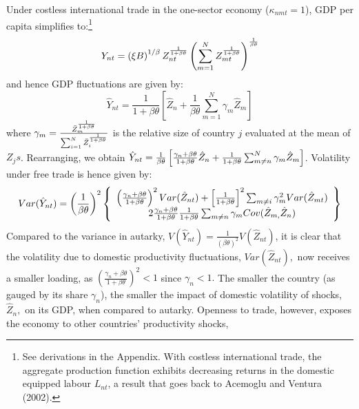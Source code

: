 \documentclass[12pt]{article}
\begin{document}
Under costless international trade in the one-sector economy ($\kappa
_{nmt}=1$), GDP per capita simplifies to:\footnote{%
See derivations in the Appendix. With costless international trade, the
aggregate production function exhibits decreasing returns in the domestic
equipped labour $L_{nt}$, a result that goes back to Acemoglu and Ventura
(2002).} 
\begin{equation*}
Y_{nt}=\left( \xi B\right) ^{1/\beta }Z_{nt}^{\frac{1}{1+\beta \theta }%
}\left( \sum_{m=1}^{N}Z_{mt}^{\frac{1}{1+\beta \theta }}\right) ^{\frac{1}{%
\beta \theta }}
\end{equation*}%
and hence GDP fluctuations are given by: 
\begin{equation*}
\hat{Y}_{nt}=\frac{1}{1+\beta \theta }\left[ \hat{Z}_{n}+\frac{1}{\beta
\theta }\sum_{m=1}^{N}\gamma _{m}\hat{Z}_{m}\right]
\end{equation*}%
where $\gamma _{m}=\frac{\bar{Z}_{m}^{\frac{1}{1+\beta \theta }}}{%
\sum_{i=1}^{N}\bar{Z}_{i}^{\frac{1}{1+\beta \theta }}}$ is the relative size
of country $j$ evaluated at the mean of $Z_{j}s$. Rearranging, we obtain $%
\hat{Y}_{nt}=\frac{1}{\beta \theta }\left[ \frac{\gamma _{n}+\beta \theta }{%
1+\beta \theta }\hat{Z}_{n}+\frac{1}{1+\beta \theta }\sum_{m\neq
n}^{N}\gamma _{m}\hat{Z}_{m}\right] $. Volatility under free trade is hence
given by: 
\begin{equation}
Var(\hat{Y}_{nt})=\left( \frac{1}{\beta \theta }\right) ^{2}\left\{ 
\begin{array}{c}
\left( \frac{\gamma _{n}+\beta \theta }{1+\beta \theta }\right) ^{2}Var(\hat{%
Z}_{nt})+\left[ \frac{1}{1+\beta \theta }\right] ^{2}\sum_{m\neq i}\gamma
_{m}^{2}Var(\hat{Z}_{mt}) \\ 
2\frac{\gamma _{n}+\beta \theta }{1+\beta \theta }\frac{1}{1+\beta \theta }%
\sum_{m\neq n}\gamma _{m}Cov(\hat{Z}_{m,}\hat{Z}_{n})%
\end{array}%
\right\}
\end{equation}%
Compared to the variance in autarky, $V(\hat{Y}_{nt})=\frac{1}{\left( \beta
\theta \right) ^{2}}V(\hat{Z}_{nt})$, it is clear that the volatility due to
domestic productivity fluctuations, $Var(\hat{Z}_{nt}),$ now receives a
smaller loading, as $\left( \frac{\gamma _{n}+\beta \theta }{1+\beta \theta }%
\right) ^{2}<1$ since $\gamma _{n}<1.$ The smaller the country (as gauged by
its share $\gamma _{n}$), the smaller the impact of domestic volatility of
shocks, $\hat{Z}_{n},$ on its GDP, when compared to autarky. Openness to
trade, however, exposes the economy to other countries' productivity shocks,
\end{document}

